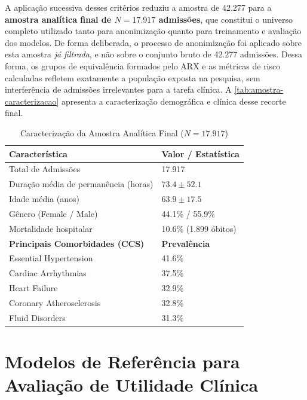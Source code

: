 A aplicação sucessiva desses critérios reduziu a amostra de 42.277 para a \textbf{amostra analítica final de $N = 17.917$ admissões}, que constitui o universo completo utilizado tanto para anonimização quanto para treinamento e avaliação dos modelos. De forma deliberada, o processo de anonimização foi aplicado sobre esta amostra \textit{já filtrada}, e não sobre o conjunto bruto de 42.277 admissões. Dessa forma, os grupos de equivalência formados pelo ARX e as métricas de risco calculadas refletem exatamente a população exposta na pesquisa, sem interferência de admissões irrelevantes para a tarefa clínica. A \autoref{tab:amostra-caracterizacao} apresenta a caracterização demográfica e clínica desse recorte final.


\begin{table}[ht]
\centering
\caption{Caracterização da Amostra Analítica Final ($N = 17.917$)}
\label{tab:amostra-caracterizacao}
\begin{tabular}{ll}
\toprule
\textbf{Característica} & \textbf{Valor / Estatística} \\ \midrule
Total de Admissões & 17.917 \\
Duração média de permanência (horas) & $73.4 \pm 52.1$ \\
Idade média (anos) & $63.9 \pm 17.5$ \\
Gênero (Female / Male) & 44.1\% / 55.9\% \\
Mortalidade hospitalar & 10.6\% (1.899 óbitos) \\
\midrule
\textbf{Principais Comorbidades (CCS)} & \textbf{Prevalência} \\
Essential Hypertension & 41.6\% \\
Cardiac Arrhythmias & 37.5\% \\
Heart Failure & 32.9\% \\
Coronary Atherosclerosis & 32.8\% \\
Fluid Disorders & 31.3\% \\
\bottomrule
\end{tabular}
\end{table}

\section{Modelos de Referência para Avaliação de Utilidade Clínica}
\label{sec:metod-concare}

